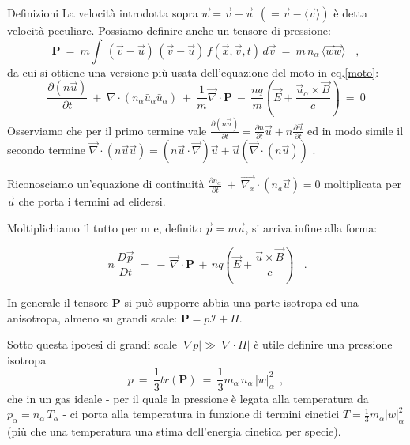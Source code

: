 \vspace{0.5cm}
\begin{approfondimento}{Definizioni}
	La velocità introdotta sopra $\boxed{\vec w = \vec v - \vec u}\ \ (= \vec v - \langle \vec v \rangle)$ è detta \underline{velocità peculiare}.
	Possiamo definire anche un \underline{tensore di pressione:}
	\[\mathbf{P}\ =\ m\int\, (\vec v - \vec u)\,(\vec v - \vec u)\, f(\vec x, \vec v, t)\, d\vec v\ =\ m \,n_\alpha\, \langle \vec w \vec w\rangle\ \ \ \ ,\]
	da cui si ottiene una versione più usata dell'equazione del moto in eq.\ref{moto}:
	\[ \frac{\partial (n \vec u)}{\partial t}\ +\  \nabla\cdot \left(n_\alpha \bar u _\alpha \bar u_\alpha \right)\ +\ \frac{1}{m} \vec \nabla\cdot \mathbf{P}\ -\ \frac{nq}{m} \left(\vec E + \frac{\vec u_\alpha \times \vec B}{c}\right)\ =\ 0 \]
	Osserviamo che per il primo termine vale $\frac{\partial (n\vec u)}{\partial t} = \frac{\partial n}{\partial t} \vec u + n\frac{\partial \vec u}{\partial t}$ ed in modo simile il secondo termine $\vec \nabla\cdot (n\vec u \vec u) = (n\vec u\cdot \vec \nabla)\vec u + \vec u (\vec \nabla\cdot (n\vec u))$ .
	
	Riconosciamo un'equazione di continuità $\frac{\partial n_\alpha}{\partial t}\ +\  \vec{\nabla_x} \cdot \left( n_a \vec u\right)=0$ moltiplicata per $\vec u$ che porta i termini ad elidersi.
	
	Moltiplichiamo il tutto per m e, definito $\vec p = m\vec u$, si arriva infine alla forma:
	
	\begin{equation}
		\label{moto eq. cinetica con pressione}
		\boxed{\ n\,\frac{D\vec p}{Dt}\ =\ - \,\vec\nabla\cdot\mathbf{P}\, +\, nq\left( \vec E + \frac{\vec u\times \vec B}{c} \right)\ }\ \ \  .		
	\end{equation}
	
	In generale il tensore $\mathbf{P}$ si può supporre abbia una parte isotropa ed una anisotropa, almeno su grandi scale: $\mathbf{P}=p \mathcal{I}+\Pi$.
	
	Sotto questa ipotesi di grandi scale $|\nabla p|\gg |\nabla\cdot \Pi|$ è utile definire una pressione isotropa 
	\[ p\ = \ \frac{1}{3} tr(\mathbf{P})\ =\ \frac{1}{3}m_\alpha\, n_\alpha\, |w|^2_\alpha\ \ , \] 
	che in un gas ideale - per il quale la pressione è legata alla temperatura da $p_\alpha=n_\alpha\, T_\alpha$ - ci porta alla temperatura in funzione di termini cinetici $T=\frac{1}{3}m_\alpha |w|^2_\alpha$ (più che una temperatura una stima dell'energia cinetica per specie).
\end{approfondimento}



